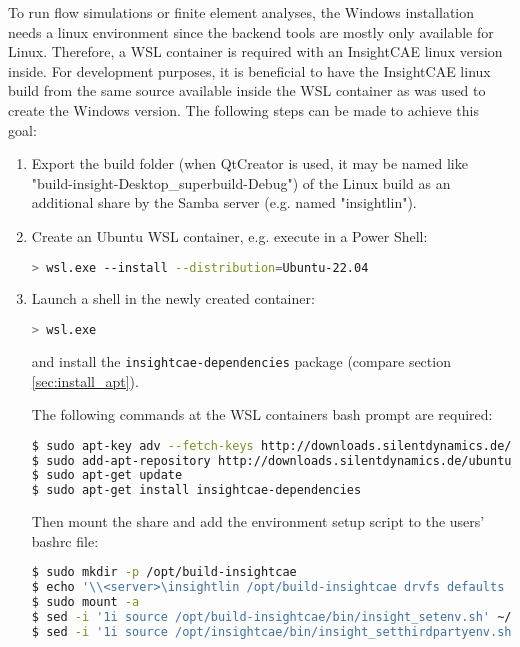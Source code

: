 To run flow simulations or finite element analyses, the Windows installation needs a linux environment since the backend tools are mostly only available for Linux.
Therefore, a WSL container is required with an InsightCAE linux version inside.
For development purposes, it is beneficial to have the InsightCAE linux build from the same source available inside the WSL container as was used to create the Windows version.
The following steps can be made to achieve this goal:
\begin{enumerate}
\item Export the build folder (when QtCreator is used, it may be named like "build-insight-Desktop\_superbuild-Debug") of the Linux build as an additional share by the Samba server (e.g. named "insightlin").
\item Create an Ubuntu WSL container, e.g. execute in a Power Shell:

\begin{lstlisting}[language=bash]
> wsl.exe --install --distribution=Ubuntu-22.04
\end{lstlisting}
\item Launch a shell in the newly created container:
\begin{lstlisting}[language=bash]
> wsl.exe
\end{lstlisting}
and install the \texttt{insightcae-dependencies} package (compare section \ref{sec:install_apt}).

The following commands at the WSL containers bash prompt are required:
\begin{lstlisting}[language=bash]
$ sudo apt-key adv --fetch-keys http://downloads.silentdynamics.de/SD_REPOSITORIES_PUBLIC_KEY.gpg
$ sudo add-apt-repository http://downloads.silentdynamics.de/ubuntu_dev
$ sudo apt-get update
$ sudo apt-get install insightcae-dependencies
\end{lstlisting}

Then mount the share and add the environment setup script to the users' bashrc file:
\begin{lstlisting}[language=bash]
$ sudo mkdir -p /opt/build-insightcae
$ echo '\\<server>\insightlin /opt/build-insightcae drvfs defaults 0 0' | sudo tee /etc/fstab
$ sudo mount -a
$ sed -i '1i source /opt/build-insightcae/bin/insight_setenv.sh' ~/.bashrc
$ sed -i '1i source /opt/insightcae/bin/insight_setthirdpartyenv.sh' ~/.bashrc
\end{lstlisting}

\end{enumerate}

